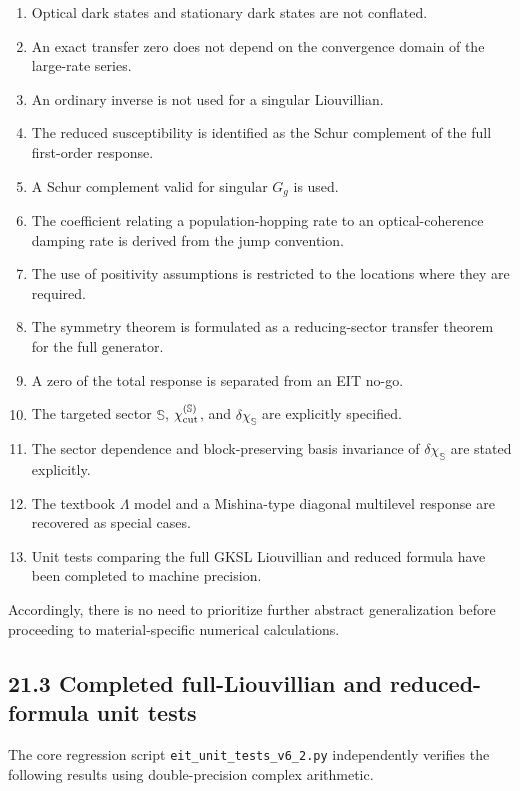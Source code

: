 \documentclass[
  10pt,
  a4paper,
]{article}
\providecommand{\tightlist}{%
  \setlength{\itemsep}{0pt}\setlength{\parskip}{0pt}}
\begin{document}
\begin{enumerate}
\def\labelenumi{\arabic{enumi}.}
\tightlist
\item
  Optical dark states and stationary dark states are not conflated.
\item
  An exact transfer zero does not depend on the convergence domain of
  the large-rate series.
\item
  An ordinary inverse is not used for a singular Liouvillian.
\item
  The reduced susceptibility is identified as the Schur complement of
  the full first-order response.
\item
  A Schur complement valid for singular \(G_g\) is used.
\item
  The coefficient relating a population-hopping rate to an
  optical-coherence damping rate is derived from the jump convention.
\item
  The use of positivity assumptions is restricted to the locations where
  they are required.
\item
  The symmetry theorem is formulated as a reducing-sector transfer
  theorem for the full generator.
\item
  A zero of the total response is separated from an EIT no-go.
\item
  The targeted sector \(\mathbb S\), \(\chi_{\rm cut}^{(\mathbb S)}\),
  and \(\delta\chi_{\mathbb S}\) are explicitly specified.
\item
  The sector dependence and block-preserving basis invariance of
  \(\delta\chi_{\mathbb S}\) are stated explicitly.
\item
  The textbook \(\Lambda\) model and a Mishina-type diagonal multilevel
  response are recovered as special cases.
\item
  Unit tests comparing the full GKSL Liouvillian and reduced formula
  have been completed to machine precision.
\end{enumerate}

Accordingly, there is no need to prioritize further abstract
generalization before proceeding to material-specific numerical
calculations.

\subsection{21.3 Completed full-Liouvillian and reduced-formula unit
tests}\label{completed-full-liouvillian-and-reduced-formula-unit-tests}

The core regression script \texttt{eit\_unit\_tests\_v6\_2.py}
independently verifies the following results using double-precision
complex arithmetic.
\end{document}
